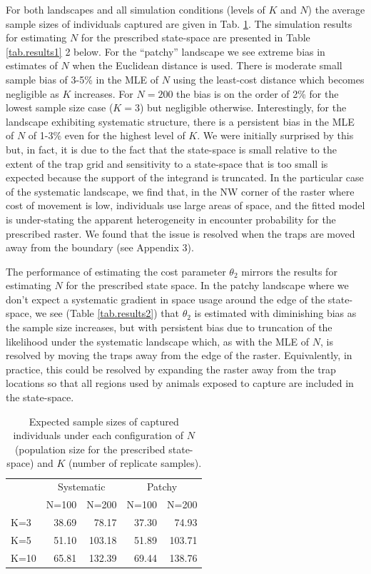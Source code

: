 For both landscapes and all simulation conditions (levels of $K$ and
$N$) the average sample sizes of individuals captured are given in
Tab. \ref{tab.samplesize}.  The simulation results for estimating $N$
for the prescribed state-space are presented in Table
\ref{tab.results1} 2 below.  For the ``patchy'' landscape we see extreme
bias in estimates of $N$ when the Euclidean distance is used. There is
moderate small sample bias of 3-5\% in the MLE of $N$ using the
least-cost distance which becomes negligible as $K$ increases. For
$N=200$ the bias is on the order of 2\% for the lowest sample size
case ($K=3$) but negligible otherwise.  Interestingly, for the
landscape exhibiting systematic structure, there is a persistent bias
in the MLE of $N$ of 1-3\% even for the highest level of $K$. We were
initially surprised by this but, in fact, it is due to the fact that
the state-space is small relative to the extent of the trap grid and
sensitivity to a state-space that is too small is expected because the
support of the integrand is truncated. In the particular case of the
systematic landscape, we find that, in the NW corner of the raster
where cost of movement is low, individuals use large areas of space,
and the fitted model is under-stating the apparent
heterogeneity in encounter probability for the prescribed raster.  We
found that the issue is resolved when the traps are moved away from
the boundary (see Appendix 3).

The performance of estimating the cost parameter $\theta_{2}$ mirrors
the results for estimating $N$ for the prescribed state space. In the
patchy landscape where we don't expect a systematic gradient in space
usage around the edge of the state-space, we see
(Table \ref{tab.results2}) that $\theta_{2}$ is estimated with
diminishing bias as the sample size increases, but with persistent
bias due to truncation of the likelihood under the systematic
landscape which, as with the MLE of $N$, is resolved by moving the
traps away from the edge of the raster. Equivalently, in practice,
this could be resolved by expanding the raster away from the trap
locations so that all regions used by animals exposed to capture are
included in the state-space.



\begin{table}[htp]
\centering
\caption{
Expected sample sizes of captured individuals under each configuration of
$N$ (population size for the prescribed state-space) and $K$ (number of replicate samples).
}
\begin{tabular}{l|rrrr}
 & \multicolumn{2}{c}{Systematic} & \multicolumn{2}{c}{Patchy}  \\
    & N=100 &  N=200  &   N=100 &  N=200  \\ \hline
K=3 &  38.69 &   78.17  &   37.30 &   74.93  \\
K=5 &  51.10 &  103.18  &   51.89 &  103.71 \\
K=10&  65.81 &  132.39  &   69.44 &  138.76 \\
\end{tabular}
\label{tab.samplesize}
\end{table}



